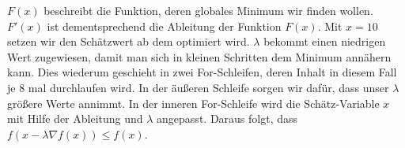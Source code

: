 $F(x)$ beschreibt die Funktion, deren globales Minimum wir finden wollen. $F'(x)$ ist dementsprechend die Ableitung der Funktion $F(x)$. Mit $x=10$ setzen wir den Schätzwert ab dem optimiert wird. $\lambda$ bekommt einen niedrigen Wert zugewiesen, damit man sich in kleinen Schritten dem Minimum annähern kann. Dies wiederum geschieht in zwei For-Schleifen, deren Inhalt in diesem Fall je 8 mal durchlaufen wird. In der äußeren Schleife sorgen wir dafür, dass unser $\lambda$ größere Werte annimmt. In der inneren For-Schleife wird die Schätz-Variable $x$ mit Hilfe der Ableitung und $\lambda$ angepasst. Daraus folgt, dass 
 $f(x-\lambda \nabla f(x)) \leq f(x)$.


